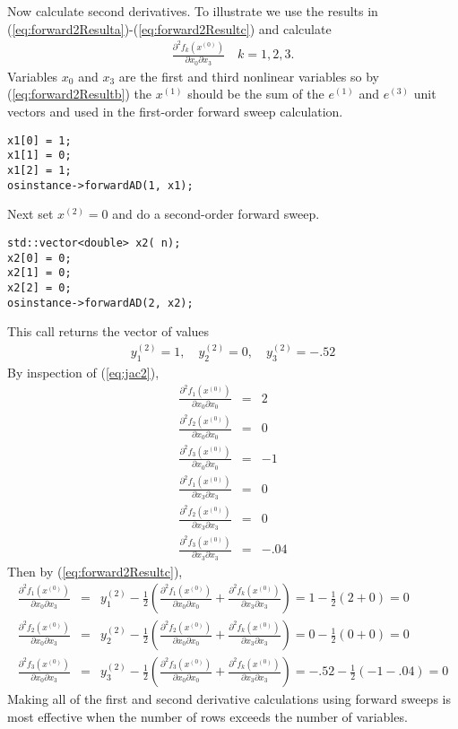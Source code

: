 \documentclass[11pt]{article}
\newcommand{\DD}[3]{ \frac{\partial^2 #1}{\partial #2 \partial #3} }
\renewcommand{\_}{{\char"5F}}
\renewcommand{\{}{{\char"7B}}
\renewcommand{\}}{{\char"7D}}
\renewcommand{\^}{{\char"0D}}
\renewcommand{\'}{{\char"0D}}
\begin{document}
Now calculate second derivatives.  To illustrate we use the results in (\ref{eq:forward2Resulta})-(\ref{eq:forward2Resultc}) and calculate
\begin{eqnarray*}
\DD{f_{k}(x^{(0)})}{x_{0}}{x_{3}} \quad k = 1, 2, 3.
\end{eqnarray*}
Variables $x_{0}$ and $x_{3}$ are the first and third nonlinear variables so by  (\ref{eq:forward2Resultb}) the $x^{(1)}$ should be the sum of the $e^{(1)}$ and $e^{(3)}$ unit vectors and used in the  first-order forward sweep calculation.
\begin{verbatim}
x1[0] = 1;
x1[1] = 0;
x1[2] = 1;
osinstance->forwardAD(1, x1);
\end{verbatim}
Next set $x^{(2)} = 0$ and do a second-order forward sweep.
\begin{verbatim}
std::vector<double> x2( n);
x2[0] = 0;
x2[1] = 0;
x2[2] = 0;
osinstance->forwardAD(2, x2);
\end{verbatim}
This call returns the vector of  values
\begin{eqnarray*}
y_{1}^{(2)}  = 1, \quad y_{2}^{(2)}  = 0, \quad y_{3}^{(2)} = -.52
\end{eqnarray*}
By inspection of (\ref{eq:jac2}),
\begin{eqnarray*}
\DD{f_{1}(x^{(0)})}{x_{0}}{x_{0}} &=& 2 \\
\DD{f_{2}(x^{(0)})}{x_{0}}{x_{0}} &=&  0\\
\DD{f_{3}(x^{(0)})}{x_{0}}{x_{0}} &=& -1 \\
\DD{f_{1}(x^{(0)})}{x_{3}}{x_{3}} &=& 0 \\
\DD{f_{2}(x^{(0)})}{x_{3}}{x_{3}} &=& 0\\
\DD{f_{3}(x^{(0)})}{x_{3}}{x_{3}} &=& -.04
\end{eqnarray*}
Then by (\ref{eq:forward2Resultc}),
\begin{eqnarray*}
\DD{f_{1}(x^{(0)})}{x_{0}}{x_{3}} &=&  y_{1}^{(2)}  -  \frac{1}{2} \left( \DD{f_{1}(x^{(0)})}{x_{0}}{x_{0}}  +  \DD{f_{k}(x^{(0)})}{x_{3}}{x_{3}}  \right) =   1 -  \frac{1}{2}(2 +  0) = 0 \\
\DD{f_{2}(x^{(0)})}{x_{0}}{x_{3}} &=&   y_{2}^{(2)}  -  \frac{1}{2} \left( \DD{f_{2}(x^{(0)})}{x_{0}}{x_{0}}  +  \DD{f_{k}(x^{(0)})}{x_{3}}{x_{3}}  \right)  = 0 -  \frac{1}{2}(0 +  0) = 0 \\
\DD{f_{3}(x^{(0)})}{x_{0}}{x_{3}} &=&  y_{3}^{(2)}  -  \frac{1}{2} \left( \DD{f_{3}(x^{(0)})}{x_{0}}{x_{0}}  +  \DD{f_{k}(x^{(0)})}{x_{3}}{x_{3}}  \right) = -.52 -  \frac{1}{2}(-1 - .04) = 0
\end{eqnarray*}
Making all of the first and second derivative calculations using forward sweeps is most effective when the number of rows exceeds the number of variables.
\end{document}
